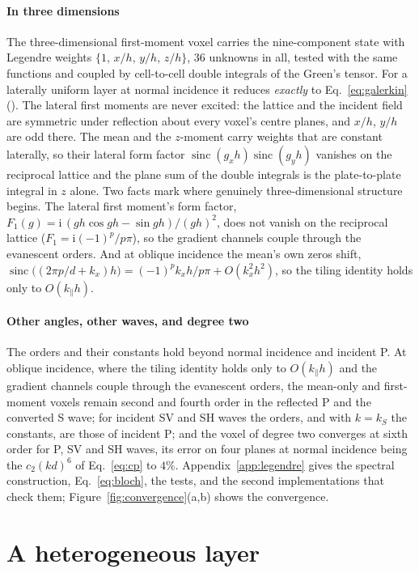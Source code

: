 \documentclass[preprint,review,12pt]{elsarticle}
\newcommand{\sinc}{\operatorname{sinc}}
\begin{document}
\paragraph{In three dimensions} The three-dimensional first-moment voxel carries the nine-component
state with Legendre weights $\{1,\,x/h,\,y/h,\,z/h\}$, 36 unknowns in all, tested with the same
functions and coupled by cell-to-cell double integrals of the Green's tensor. For a laterally uniform
layer at normal incidence it reduces \emph{exactly} to Eq.~\eqref{eq:galerkin}
(). The lateral first moments are never excited: the lattice and
the incident field are symmetric under reflection about every voxel's centre planes, and $x/h$, $y/h$
are odd there. The mean and the $z$-moment carry weights that are constant laterally, so their lateral
form factor $\sinc(g_xh)\sinc(g_yh)$ vanishes on the reciprocal lattice and the plane sum of the
double integrals is the plate-to-plate integral in $z$ alone. Two facts mark where genuinely
three-dimensional structure begins. The lateral first moment's form factor,
$F_1(g)=\mathrm{i}\,(gh\cos gh-\sin gh)/(gh)^2$, does not vanish on the reciprocal lattice
($F_1=\mathrm{i}(-1)^p/p\pi$), so the gradient channels couple through the evanescent orders. And at oblique
incidence the mean's own zeros shift, $\sinc\bigl((2\pi p/d+k_x)h\bigr)=(-1)^p k_xh/p\pi+O(k_x^2h^2)$,
so the tiling identity holds only to $O(k_\parallel h)$.

\paragraph{Other angles, other waves, and degree two} The orders and their constants hold beyond
normal incidence and incident P. At oblique incidence, where the tiling identity holds only to
$O(k_\parallel h)$ and the gradient channels couple through the evanescent orders, the mean-only and
first-moment voxels remain second and fourth order in the reflected P and the converted S wave; for
incident SV and SH waves the orders, and with $k=k_S$ the constants, are those of incident P; and the
voxel of degree two converges at sixth order for P, SV and SH waves, its error on four planes at normal
incidence being the $c_2(kd)^6$ of Eq.~\eqref{eq:cp} to $4\%$. Appendix~\ref{app:legendre} gives the
spectral construction, Eq.~\eqref{eq:bloch}, the tests, and the second implementations that check
them; Figure~\ref{fig:convergence}(a,b) shows the convergence.


\FloatBarrier
\section{A heterogeneous layer}\label{sec:hetero}
\end{document}
